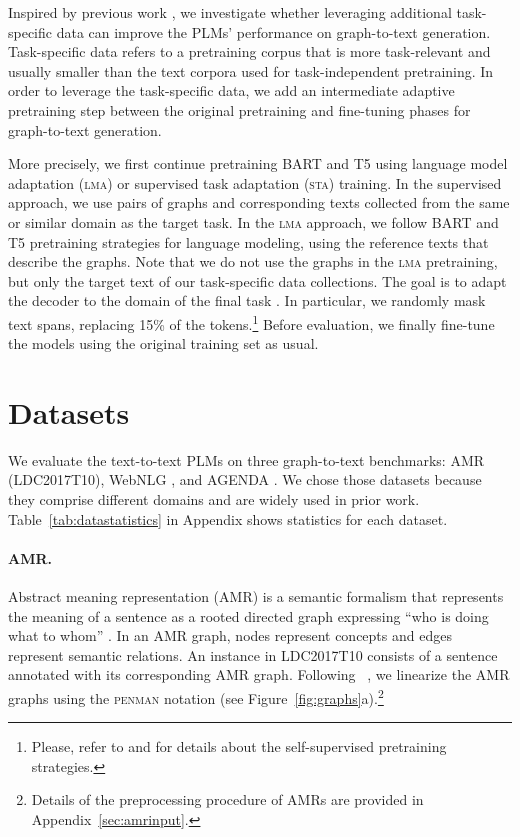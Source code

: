 \documentclass[11pt]{article}
\begin{document}
Inspired by previous work \cite{konsas_17,gururangan-etal-2020-dont}, we investigate whether leveraging additional task-specific data can improve the PLMs' performance on graph-to-text generation. Task-specific data refers to a pretraining corpus that is more task-relevant and usually smaller than the text corpora used for task-independent pretraining. In order to leverage the task-specific data, we add an intermediate adaptive pretraining step between the original pretraining and fine-tuning phases for graph-to-text generation. 



More precisely, we first continue pretraining BART and T5 using language model adaptation (\textsc{lma}) or supervised task adaptation (\textsc{sta}) training. In the supervised approach, we use pairs of graphs and corresponding texts collected from the same or similar domain as the target task. In the \textsc{lma} approach, we follow BART and T5 pretraining strategies for language modeling, using the reference texts that describe the graphs. Note that we do not use the graphs in the \textsc{lma} pretraining, but only the target text of our task-specific data collections. The goal is to adapt the decoder to the domain of the final task  \cite{gururangan-etal-2020-dont}. In particular, we randomly mask text spans, replacing 15\% of the tokens.\footnote{Please, refer to \citet{lewis2019bart} and \citet{2019t5} for details about the self-supervised pretraining strategies.}
Before evaluation, we finally fine-tune the models using the original training set as usual.


\section{Datasets}
\label{sec:data}

We evaluate the text-to-text PLMs on three graph-to-text benchmarks: AMR (LDC2017T10), WebNLG \cite{gardent-etal-2017-webnlg}, and AGENDA \cite{koncel-kedziorski-etal-2019-text}. We chose those datasets because they comprise different domains and are widely used in prior work. Table~\ref{tab:datastatistics} in Appendix shows statistics for each dataset.



\paragraph{AMR.} Abstract meaning representation (AMR) is a semantic formalism that represents the meaning of a sentence as a rooted directed graph expressing ``who is doing what to whom'' \cite{banarescu-etal-2013-abstract}. In an AMR graph, nodes represent concepts and edges represent semantic relations. An instance in LDC2017T10 consists of a sentence annotated with its corresponding AMR graph. Following ~\citet{mager2020gpttoo}, we linearize the AMR graphs using the \textsc{penman} notation (see Figure~\ref{fig:graphs}a).\footnote{Details of the preprocessing procedure of AMRs are provided in Appendix~\ref{sec:amrinput}.}
\end{document}
